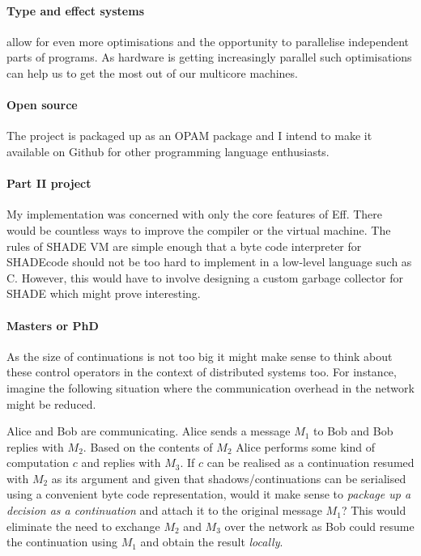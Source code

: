 \documentclass[class=article, crop=false]{standalone}
\begin{document}
\paragraph{Type and effect systems}
\cite{bauer2013effect} allow for even more optimisations
and the opportunity to parallelise independent parts of programs. As hardware is
getting increasingly parallel such optimisations can help us to get the most out
of our multicore machines.

\paragraph{Open source}
The project is packaged up as an OPAM package and I intend to make it available
on Github for other programming language enthusiasts.

\paragraph{Part II project}
My implementation was concerned with only the core
features of Eff. There would be countless ways to improve the compiler or the
virtual machine. The rules of SHADE VM are simple enough that a byte code interpreter
for SHADEcode should not be too hard to implement in a low-level language such as C.
However, this would have to involve designing a custom garbage collector for SHADE
which might prove interesting.

\paragraph{Masters or PhD}
As the size of continuations is not too big it might make sense to think about
these control operators in the context of distributed systems too.
For instance, imagine the following situation where the communication overhead
in the network might be reduced.

Alice and Bob are communicating. Alice sends a message $M_1$ to Bob and Bob
replies with $M_2$. Based on the contents of $M_2$ Alice performs some kind of
computation $c$ and replies with $M_3$. If $c$ can be realised as a continuation
resumed with $M_2$ as its argument and given that shadows/continuations can be
serialised using a convenient byte code representation, would it make sense to
\emph{package up a decision as a continuation} and attach it to the original
message $M_1$? This would eliminate the need to exchange $M_2$ and $M_3$
over the network as Bob could resume the continuation using $M_1$ and obtain
the result \emph{locally}.
\end{document}
